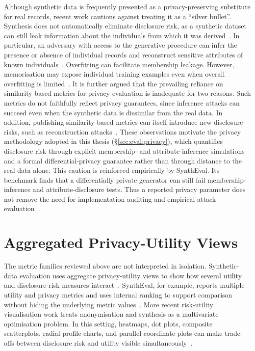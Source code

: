 Although synthetic data is frequently presented as a privacy-preserving
substitute for real records, recent work cautions against treating it as a
``silver bullet''. Synthesis does not automatically
eliminate disclosure risk, as a synthetic dataset can still leak information
about the individuals from which it was derived~\cite{stadler2022synthetic}.
In particular, an adversary with access to the generative procedure can infer
the presence or absence of individual records and reconstruct sensitive
attributes of known individuals~\cite{houssiau2022tapas}. Overfitting can 
facilitate membership leakage. However,
memorisation may expose individual training examples even when overall
overfitting is limited~\cite{Shokri2017MIA,Carlini2021Extracting}.
It is further argued that the prevailing reliance on similarity-based 
metrics for privacy evaluation is inadequate for two reasons. Such metrics 
do not faithfully reflect privacy guarantees, since inference attacks can 
succeed even when the synthetic data is dissimilar from the real data. 
In addition, publishing similarity-based metrics can itself introduce 
new disclosure risks, such as reconstruction attacks~\cite{kaabachi2025scoping}. These
observations motivate the privacy methodology adopted in this thesis
(\S\ref{sec:eval:privacy}), which quantifies disclosure risk through explicit
membership- and attribute-inference simulations and a formal
differential-privacy guarantee rather than through distance to the real data
alone. This caution is reinforced empirically by SynthEval. Its benchmark
finds that a differentially private generator can still fail
membership-inference and attribute-disclosure tests. Thus a reported 
privacy parameter does not remove the need for implementation auditing 
and empirical attack evaluation~\cite{lautrup2025syntheval}.

\section{Aggregated Privacy-Utility Views}
\label{sec:bg:aggregate-views}

The metric families reviewed above are not interpreted in
isolation. Synthetic-data evaluation uses aggregate
privacy-utility views to show how several utility and disclosure-risk
measures interact~\cite{thees2025beyond}. SynthEval, for example, reports multiple utility and
privacy metrics and uses internal ranking to support comparison without
hiding the underlying metric values~\cite{lautrup2025syntheval}. More 
recent risk-utility visualisation work treats anonymisation and 
synthesis as a multivariate optimisation problem. In this setting, 
heatmaps, dot plots, composite scatterplots, radial profile charts, 
and parallel coordinate plots can make trade-offs between disclosure risk 
and utility visible simultaneously~\cite{thees2025beyond}.

